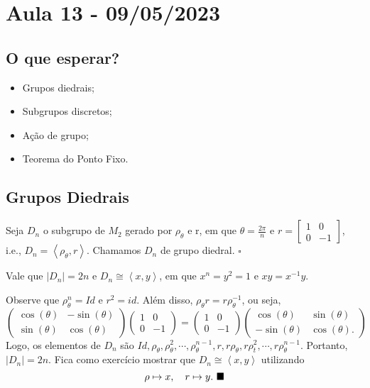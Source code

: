 \documentclass[Algebra/algebra_notes.tex]{subfiles}
\begin{document}
\section{Aula 13 - 09/05/2023}
\subsection{O que esperar?}
\begin{itemize}
	\item Grupos diedrais;
	\item Subgrupos discretos;
	\item Ação de grupo;
	\item Teorema do Ponto Fixo.
\end{itemize}
\subsection{Grupos Diedrais}
\begin{def*}
	Seja \(D_{n}\) o subgrupo de \(M_{2}\) gerado por \(\rho _{\theta }\) e r,
	em que \(\theta =\frac{2\pi }{n}\) e \(r = \begin{bmatrix}
		1 & 0  \\
		0 & -1
	\end{bmatrix}\), i.e., \(D_{n}=\left< \rho _{\theta }, r \right>.\) Chamamos
	\(D_{n}\) de grupo diedral. \(\square\)
\end{def*}
\begin{prop*}
	Vale que \(|D_{n}|=2n\) e \(D_{n}\cong{\left< x, y \right>}\), em que \(x^{n} = y^2=1\) e
	\(xy=x^{-1}y\).
\end{prop*}
\begin{proof*}
	Observe que \(\rho _{\theta }^{n} = Id\) e \(r^2 = id\). Além disso, \(\rho _{\theta }r = r\rho_{\theta }^{-1}\), ou seja,
	\[
		\begin{pmatrix}
			\cos{(\theta )} & -\sin{(\theta )} \\
			\sin{(\theta )} & \cos{(\theta )}
		\end{pmatrix}\begin{pmatrix}
			1 & 0  \\
			0 & -1
		\end{pmatrix} = \begin{pmatrix}
			1 & 0  \\
			0 & -1
		\end{pmatrix}\begin{pmatrix}
			\cos{(\theta )}  & \sin{(\theta )}  \\
			-\sin{(\theta )} & \cos{(\theta )}.
		\end{pmatrix}
	\]
	Logo, os elementos de \(D_{n}\) são \(Id, \rho _{\theta }, \rho _{\theta }^2, \cdots, \rho _{\theta }^{n-1},
	r, r\rho _{\theta }, r\rho _{t}^{2}, \cdots, r\rho _{\theta }^{n-1}\). Portanto,
	\(|D_{n}| = 2n\). Fica como exercício mostrar que \(D_{n}\cong{\left< x, y \right>}\) utilizando
	\[
		\rho \mapsto x, \quad r\mapsto y.\text{ $\blacksquare$}
	\]
\end{proof*}
\end{document}
